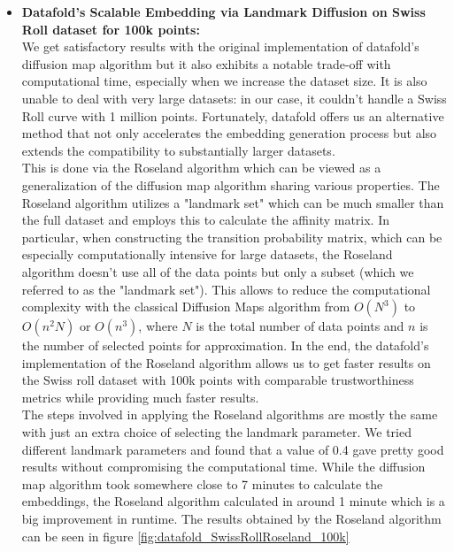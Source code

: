 \begin{itemize}
\begin{itemize}
	      	\item \textbf{Datafold's Scalable Embedding via Landmark Diffusion on Swiss Roll dataset for 100k points:}\\
	      	      We get satisfactory results with the original implementation of datafold's diffusion map algorithm but it also exhibits a notable trade-off with computational time, especially when we increase the dataset size. It is also unable to deal with very large datasets: in our case, it couldn't handle a Swiss Roll curve with 1 million points. Fortunately, datafold offers us an alternative method that not only accelerates the embedding generation process but also extends the compatibility to substantially larger datasets.\\
	      	      This is done via the Roseland algorithm which can be viewed as a generalization of the diffusion map algorithm sharing various properties. The Roseland algorithm utilizes a "landmark set" which can be much smaller than the full dataset and employs this to calculate the affinity matrix. In particular, when constructing the transition probability matrix, which can be especially computationally intensive for large datasets, the Roseland algorithm doesn't use all of the data points but only a subset (which we referred to as the "landmark set"). This allows to reduce the computational complexity with the classical Diffusion Maps algorithm from $O(N^3)$ to $O(n^2N)$ or $O(n^3)$, where $N$ is the total number of data points and $n$ is the number of selected points for approximation. 
                    In the end, the datafold's implementation of the Roseland algorithm allows us to get faster results on the Swiss roll dataset with 100k points with comparable trustworthiness metrics while providing much faster results.\\
	      	      The steps involved in applying the Roseland algorithms are mostly the same with just an extra choice of selecting the landmark parameter. We tried different landmark parameters and found that a value of 0.4 gave pretty good results without compromising the computational time. While the diffusion map algorithm took somewhere close to 7 minutes to calculate the embeddings, the Roseland algorithm calculated in around 1 minute which is a big improvement in runtime. The results obtained by the Roseland algorithm can be seen in figure \ref{fig:datafold_SwissRollRoseland_100k}
	      	      

\end{itemize}
\end{itemize}
